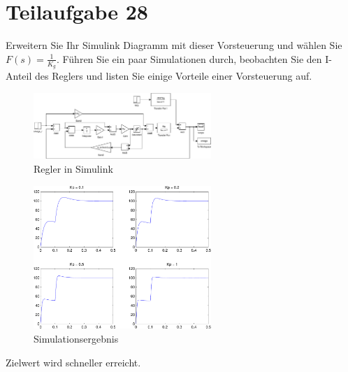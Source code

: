 \section{Teilaufgabe 28}
\begin{aufgabe}
    Erweitern Sie Ihr Simulink Diagramm mit dieser Vorsteuerung und wählen Sie 
    $F(s) = \frac{1}{K_g}$. Führen Sie ein paar Simulationen durch, beobachten 
    Sie den I-Anteil des Reglers und listen Sie einige Vorteile einer 
    Vorsteuerung auf.
\end{aufgabe}
\begin{figure}[h!]
    \centering
    \includegraphics[width=0.6\textwidth]{28/regler_feedforward.pdf}
    \caption{Regler in Simulink}
    \label{fig:28}
\end{figure}
\begin{figure}[h!]
    \centering
    \includegraphics[width=0.6\textwidth]{28/regler_feedforward_plot.pdf}
    \caption{Simulationsergebnis}
    \label{fig:28plot}
\end{figure}

Zielwert wird schneller erreicht. 
